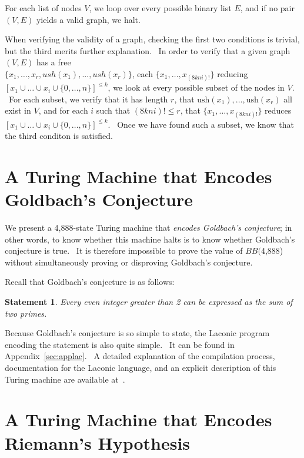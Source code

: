 \documentclass[11pt]{article}
\newtheorem{statement}{Statement}
\newcommand{\gbstatenumstate}{4,888-state }
\newcommand{\bbgbstatenum}{$BB($4,888) }
\begin{document}
For each list of nodes $V$, we loop over every possible binary list $E$, and if no pair $(V, E)$ yields a valid graph, we halt.

When verifying the validity of a graph, checking the first two conditions is trivial, but the third merits further explanation. \ In order to verify that a given graph $(V, E)$ has a free \\ $\{x_1,\dots,x_r, ush(x_1),...,ush(x_r)\}$, each  $\{x_1, \dots, x_{(8kni)!}\}$ reducing $[x_1 \cup \dots \cup x_i \cup \{0,\dots,n\}]^{\le k}$, we look at every possible subset of the nodes in $V$. \ For each subset, we verify that it has length $r$, that $\textrm{ush}(x_1),...,\textrm{ush}(x_r)$ all exist in $V$, and for each $i$ such that $(8kni)! \le r$, that $\{x_1, \dots, x_{(8kni)!}\}$ reduces $[x_1 \cup \dots \cup x_i \cup \{0,\dots,n\}]^{\le k}$. \ Once we have found such a subset, we know that the third conditon is satisfied.

\section{A Turing Machine that Encodes Goldbach's Conjecture} \label{sec:g}

We present a \gbstatenumstate Turing machine that \emph{encodes Goldbach's conjecture}; in other words, to know whether this machine halts is to know whether Goldbach's conjecture is true. \ It is therefore impossible to prove the value of \bbgbstatenum without simultaneously proving or disproving Goldbach's conjecture.

Recall that Goldbach's conjecture is as follows:

\begin{statement}
\emph{Every even integer greater than 2 can be expressed as the sum of two primes.}
\label{goldbachstatement}
\end{statement}

Because Goldbach's conjecture is so simple to state, the Laconic program encoding the statement is also quite simple. \ It can be found in Appendix~\ref{sec:applac}. \ A detailed explanation of the compilation process, documentation for the Laconic language, and an explicit description of this Turing machine are available at~\cite{github}.

\section{A Turing Machine that Encodes Riemann's Hypothesis}
\end{document}
